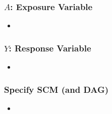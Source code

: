 \documentclass{beamer}
\begin{document}
\begin{frame}
 \frametitle{$A$: Exposure Variable}
  \begin{itemize}
    \item 
  \end{itemize}

\end{frame}

\begin{frame}
 \frametitle{$Y$: Response Variable}
  \begin{itemize}
    \item 
  \end{itemize}

\end{frame}

\begin{frame}
 \frametitle{Specify  SCM (and DAG)}
  \begin{itemize}
    \item 
  \end{itemize}

\end{frame}
\end{document}
